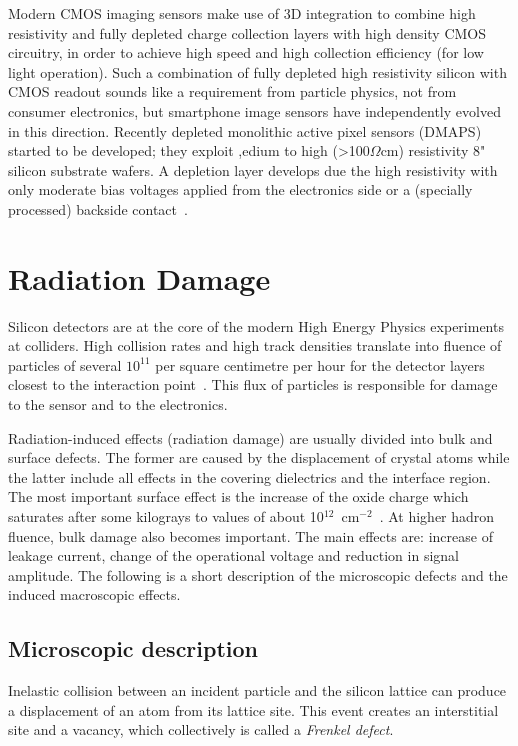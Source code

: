 Modern CMOS imaging sensors make use of 3D integration to combine high resistivity and 
fully depleted charge collection layers with high density CMOS circuitry, in order to achieve high speed 
and high collection efficiency (for low light operation). Such a combination of fully depleted high 
resistivity silicon with CMOS readout sounds like a requirement from particle physics, not from 
consumer electronics, but smartphone image sensors have independently evolved in this 
direction. Recently depleted monolithic active pixel sensors 
(DMAPS) started to be developed; they exploit ,edium to high (>100$\Omega$cm) resistivity 8" silicon substrate wafers. A depletion layer develops due the high resistivity with only moderate bias voltages applied from the electronics side or a (specially processed) backside 
contact~\cite{Garcia-Sciveres:2017ymt}.

\section{Radiation Damage}
\label{sec:RadDam}

Silicon detectors are at the core of the modern High Energy Physics experiments at colliders. 
High collision rates 
and high track densities translate into fluence of particles of several $10^{11}$ per square centimetre 
per hour for the detector layers closest to the interaction point~\cite{rossi2006pixel}. This flux of 
particles is responsible for damage to the sensor and to the electronics. 

Radiation-induced effects (radiation damage) are usually divided into bulk and surface defects. The 
former are caused by the displacement of crystal atoms while the latter include all effects in the 
covering dielectrics and the interface region. The most important surface effect is the increase of the 
oxide charge which saturates after some kilograys to values of about 10$^{12}$~cm$^{-2}$~\cite{Oldham}. 
At higher hadron fluence, bulk damage also becomes important. The main effects are: increase of 
leakage current, change of the operational voltage and reduction in signal amplitude. 
The following is a short description of the microscopic defects and the induced macroscopic effects.

\subsection{Microscopic description}
Inelastic collision between an incident particle and the silicon lattice can produce a displacement 
of an atom from its lattice site. This event creates an interstitial site and a vacancy, which 
collectively is called a {\it Frenkel defect}. 

